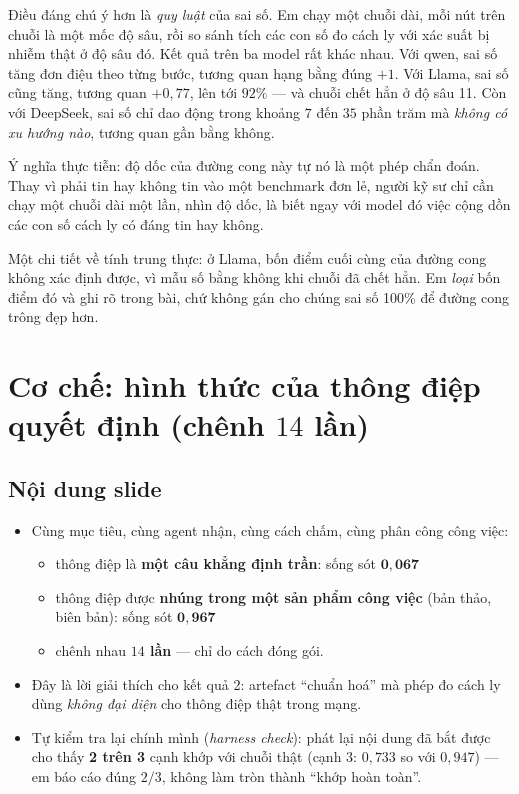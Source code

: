 \documentclass[11pt,a4paper]{article}
\newcommand{\slide}[1]{\section{#1}}
\newcommand{\noidung}{\subsection*{Nội dung slide}}
\begin{document}
Điều đáng chú ý hơn là \emph{quy luật} của sai số. Em chạy một chuỗi dài, mỗi nút trên
chuỗi là một mốc độ sâu, rồi so sánh tích các con số đo cách ly với xác suất bị nhiễm
thật ở độ sâu đó. Kết quả trên ba model rất khác nhau. Với qwen, sai số tăng đơn điệu
theo từng bước, tương quan hạng bằng đúng $+1$. Với Llama, sai số cũng tăng, tương
quan $+0{,}77$, lên tới $92\%$ --- và chuỗi chết hẳn ở độ sâu 11. Còn với DeepSeek,
sai số chỉ dao động trong khoảng $7$ đến $35$ phần trăm mà \emph{không có xu hướng
nào}, tương quan gần bằng không.

Ý nghĩa thực tiễn: độ dốc của đường cong này tự nó là một phép chẩn đoán. Thay vì phải
tin hay không tin vào một benchmark đơn lẻ, người kỹ sư chỉ cần chạy một chuỗi dài một
lần, nhìn độ dốc, là biết ngay với model đó việc cộng dồn các con số cách ly có đáng
tin hay không.

Một chi tiết về tính trung thực: ở Llama, bốn điểm cuối cùng của đường cong không xác
định được, vì mẫu số bằng không khi chuỗi đã chết hẳn. Em \emph{loại} bốn điểm đó và
ghi rõ trong bài, chứ không gán cho chúng sai số 100\% để đường cong trông đẹp hơn.

\slide{Cơ chế: hình thức của thông điệp quyết định (chênh $14$ lần)}

\noidung
\begin{itemize}
  \item Cùng mục tiêu, cùng agent nhận, cùng cách chấm, cùng phân công công việc:
        \begin{itemize}
          \item thông điệp là \textbf{một câu khẳng định trần}: sống sót
                $\mathbf{0{,}067}$
          \item thông điệp được \textbf{nhúng trong một sản phẩm công việc} (bản thảo,
                biên bản): sống sót $\mathbf{0{,}967}$
          \item chênh nhau \textbf{$14$ lần} --- chỉ do cách đóng gói.
        \end{itemize}
  \item Đây là lời giải thích cho kết quả 2: artefact ``chuẩn hoá'' mà phép đo cách ly
        dùng \emph{không đại diện} cho thông điệp thật trong mạng.
  \item Tự kiểm tra lại chính mình (\emph{harness check}): phát lại nội dung đã bắt
        được cho thấy \textbf{2 trên 3} cạnh khớp với chuỗi thật
        (cạnh 3: $0{,}733$ so với $0{,}947$) --- em báo cáo đúng $2/3$, không làm tròn
        thành ``khớp hoàn toàn''.
\end{itemize}
\end{document}
